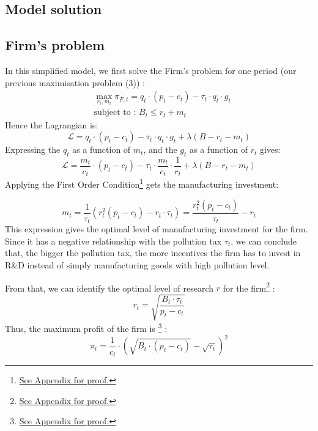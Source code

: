 \documentclass{article}
\begin{document}
\subsection{Model solution}

\subsection{Firm's problem}
In this simplified model, we first solve the Firm's problem for one period (our previous maximisation problem (3)) : 
\begin{equation*}
    \begin{split}
    & \max_{r_{t},m_{t}}{\pi_{F,t}=q_{t}\cdot\left(p_{t}-c_{t}\right)-\tau_{t}\cdot q_{t}\cdot g_{t}} \\ 
    & \text{subject to : } B_{t} \leq r_{t} + m_{t}
    \end{split}
\end{equation*}
Hence the Lagrangian is: 
\begin{equation*}
    \mathcal{L} = q_{t}\cdot\left(p_{t}-c_{t}\right)-\tau_{t}\cdot q_{t}\cdot g_{t}+\lambda\left(B-r_{t}-m_{t}\right)
\end{equation*}
Expressing the $q_{t}$ as a function of $m_{t}$, and the $g_{t}$ as a function of $r_{t}$ gives: 
\begin{equation*}
    \mathcal{L} = \frac{m_{t}}{c_{t}}\cdot\left(p_{t}-c_{t}\right)-\tau_{t}\cdot \frac{m_{t}}{c_{t}}\cdot \frac{1}{r_{t}}+\lambda\left(B-r_{t}-m_{t}\right)
\end{equation*}
Applying the First Order Condition\footnote{\hyperref[sec:proof3]{See Appendix for proof.}} gets the manufacturing investment:


\begin{equation}
    m_{t}=\frac{1}{\tau_{t}}\left(r_{t}^{2}(p_{t}-c_{t})-r_{t}\cdot \tau_{t}\right)=\frac{r_{t}^{2}\left(p_{t}-c_{t}\right)}{\tau_{t}}-r_{t}
\end{equation}
This expression gives the optimal level of manufacturing investment for the firm. Since it has a negative relationship with the pollution tax $\tau_{t}$, we can conclude that, the bigger the pollution tax, the more incentives the firm has to invest in R\&D instead of simply manufacturing goods with high pollution level. 

From that, we can identify the optimal level of research $r$ for the firm\footnote{\hyperref[sec:proof4]{See Appendix for proof.}} :
\begin{equation}
    r_{t}=\sqrt{\frac{B_{t}\cdot \tau_{t}}{p_{t}-c_{t}}}
\end{equation}
Thus, the maximum profit of the firm is \footnote[5]{\hyperref[sec:proof5]{See Appendix for proof.}} : 
\begin{equation}
    \pi_{t}=\frac{1}{c_{t}}\cdot\left({\sqrt{B_{t}\cdot (p_{t}-c_{t})}-\sqrt{\tau_{t}}}\right)^{2}
\end{equation}
\end{document}

